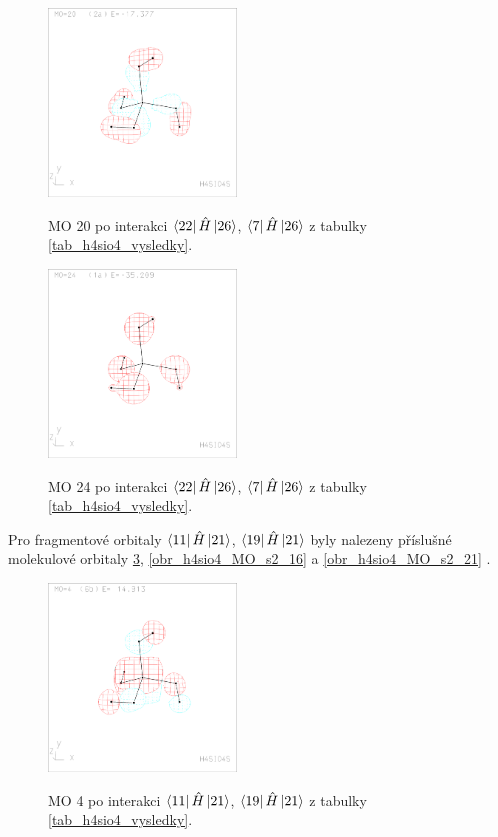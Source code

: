 \documentclass[
  digital, %
  table,   %
  lof,     %
  lot,     %
]{fithesis3}
\begin{document}
\begin{figure}[h]
\caption{MO 20 po interakci $\bra{22}{\hat{H}}\ket{26}$, $\bra{7}{\hat{H}}\ket{26}$ z tabulky \ref{tab_h4sio4_vysledky}.  }
  \center
  \includegraphics[width=5cm]{h4sio4_obrazky/s1_20.eps}
  \label{obr_h4sio4_MO_s1_20}
  \end{figure}

\begin{figure}[h]
\caption{MO 24 po interakci $\bra{22}{\hat{H}}\ket{26}$, $\bra{7}{\hat{H}}\ket{26}$ z tabulky \ref{tab_h4sio4_vysledky}.  }
  \center
  \includegraphics[width=5cm]{h4sio4_obrazky/s1_24.eps}
  \label{obr_h4sio4_MO_s1_24}
  \end{figure}
  
  Pro fragmentové orbitaly $\bra{11}{\hat{H}}\ket{21}$, $\bra{19}{\hat{H}}\ket{21}$ byly nalezeny příslušné molekulové orbitaly \ref{obr_h4sio4_MO_s2_4}, \ref{obr_h4sio4_MO_s2_16} a \ref{obr_h4sio4_MO_s2_21} .
  
  \begin{figure}[h]
\caption{MO 4 po interakci $\bra{11}{\hat{H}}\ket{21}$, $\bra{19}{\hat{H}}\ket{21}$ z tabulky \ref{tab_h4sio4_vysledky}.  }
  \center
  \includegraphics[width=5cm]{h4sio4_obrazky/s2_4.eps}
  \label{obr_h4sio4_MO_s2_4}
  \end{figure}
\end{document}
